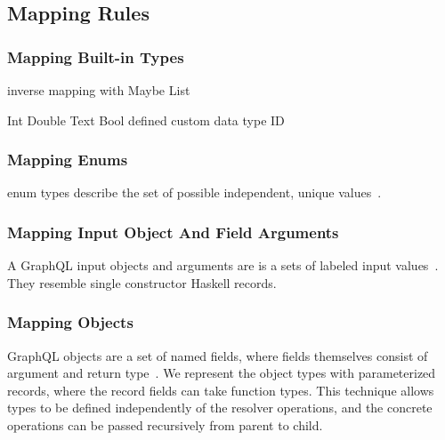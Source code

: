 
\subsection{Mapping Rules}

\begin{frame}\frametitle{Mapping Built-in Types}
\begin{itemize}
  \begin{itemize}
     inverse mapping with Maybe
     List
  \end{itemize}
  \begin{itemize}
     Int
     Double
     Text
     Bool
      defined custom data type ID 
  \end{itemize}
\end{itemize}
\end{frame}

\begin{frame}\frametitle{Mapping Enums}

enum types describe the set of possible independent, unique values~\cite{gql-spec}.



\end{frame}

\begin{frame}\frametitle{Mapping Input Object And Field Arguments}

A GraphQL input objects and arguments are is a sets of labeled input values~\cite{gql-spec}. They resemble single constructor Haskell records. 



\end{frame}
\begin{frame}[allowframebreaks]\frametitle{Mapping Objects}

GraphQL objects are a set of named fields, where fields themselves consist of argument and return type~\cite{gql-spec}. We represent the object types with parameterized records, where the record fields can take function types. This technique allows types to be defined independently of the resolver operations, and the concrete operations can be passed recursively from parent to child. 


\end{frame}

